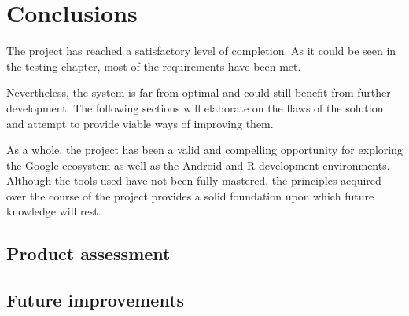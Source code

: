 \chapter{Conclusions}
The project has reached a satisfactory level of completion.
As it could be seen in the testing chapter, most of the requirements have been met.

Nevertheless, the system is far from optimal and could still benefit from further development.
The following sections will elaborate on the flaws of the solution and attempt to provide viable ways of improving them.

As a whole, the project has been a valid and compelling opportunity for exploring the Google ecosystem as well as the Android and R development environments.
Although the tools used have not been fully mastered, the principles acquired over the course of the project provides a solid foundation upon which future knowledge will rest.


\section{Product assessment}


\section{Future improvements}
